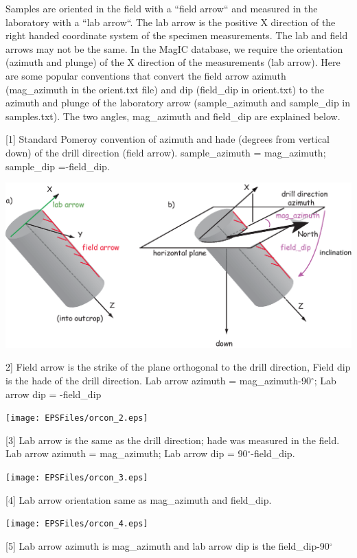 \documentclass[11pt]{book}
\begin{document}
{{Samples are oriented in the field with a ``field arrow`` and measured in the laboratory with a ``lab arrow``. The lab arrow is the positive X direction of the right handed coordinate system of the specimen measurements. The lab and field arrows may not be the same. In the MagIC database, we require the orientation (azimuth and plunge) of the X direction of the measurements (lab arrow). Here are some popular conventions that convert the field arrow azimuth (mag\_azimuth in the orient.txt file) and dip (field\_dip in orient.txt) to the azimuth and plunge of the laboratory arrow (sample\_azimuth and sample\_dip in samples.txt). The two angles, mag\_azimuth and field\_dip are explained below.

{\parindent 0pt
[1] Standard Pomeroy convention of azimuth and hade (degrees from vertical down) of the drill direction (field arrow). sample\_azimuth = mag\_azimuth; sample\_dip =-field\_dip.

  \includegraphics[width=15cm]{EPSFiles/orcon_1.eps}

  2] Field arrow is the strike of the plane orthogonal to the drill direction, Field dip is the hade of the drill direction. Lab arrow azimuth = mag\_azimuth-90$^{\circ}$; Lab arrow dip = -field\_dip

    \texttt{[image: EPSFiles/orcon\_2.eps]}

  [3] Lab arrow is the same as the drill direction; hade was measured in the field. Lab arrow azimuth = mag\_azimuth; Lab arrow dip = 90$^{\circ}$-field\_dip.

      \texttt{[image: EPSFiles/orcon\_3.eps]}

  [4] Lab arrow orientation same as mag\_azimuth and field\_dip.

        \texttt{[image: EPSFiles/orcon\_4.eps]}

        [5]  Lab arrow azimuth is  mag\_azimuth and lab arrow dip is the  field\_dip-90$^{\circ}$

}}}
\end{document}
